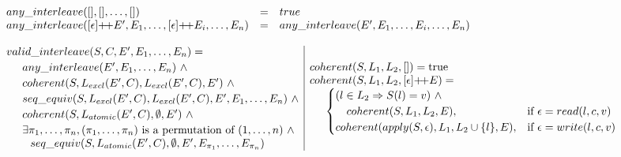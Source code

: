 \begin{figure*}
$$
\begin{array}{@{}l@{}}
\begin{array}{@{}lll@{}}
any\_interleave([], [], \ldots, []) & = & true \\
any\_interleave([ \epsilon ] \dplus E', E_1, \ldots, [ \epsilon ] \dplus E_i, \ldots, E_n) & = & any\_interleave(E', E_1, \ldots, E_i, \ldots, E_n) \\
\\
\multicolumn{3}{@{}l}{
\begin{array}{@{}l|l@{}}
\begin{array}{@{}l@{}}
valid\_interleave(S, C, E', \oton{E}) = \vspace{0.03in} \\
\hspace{0.2in} any\_interleave(E', \oton{E})\ \wedge \vspace{0.03in} \\
\hspace{0.2in} coherent(S, L_{excl}(E', C), L_{excl}(E', C), E')\ \wedge \vspace{0.03in} \\
\hspace{0.2in} seq\_equiv(S, L_{excl}(E', C), L_{excl}(E', C), E', \oton{E})\ \wedge \vspace{0.03in} \\
\hspace{0.2in} coherent(S, L_{atomic}(E', C), \emptyset, E')\ \wedge \vspace{0.03in} \\
\hspace{0.2in} \exists \oton{\pi}, (\oton{\pi}) \text{ is a permutation of } (1,\ldots,n)\ \wedge \\
\hspace{0.3in} seq\_equiv(S, L_{atomic}(E', C), \emptyset, E', E_{\pi_1}, \ldots, E_{\pi_n})
\end{array} &
\begin{array}{@{}l@{}}
coherent(S, L_1, L_2, []) = \text{true} \\
coherent(S, L_1, L_2, [ \epsilon ] \dplus E) = \\
\hspace{0.2in}
\begin{cases}
(l \in L_2 \Rightarrow S(l) = v)\ \wedge \\
\ \ \ coherent(S, L_1, L_2, E), & \text{if $\epsilon = read(l, c, v)$} \\
coherent(apply(S, \epsilon), L_1, L_2 \cup \{ l \}, E), & \text{if $\epsilon = write(l, c, v)$} \\

\end{cases}
\end{array}
\end{array}}
\end{array}
\end{array}$$
\end{figure*}
